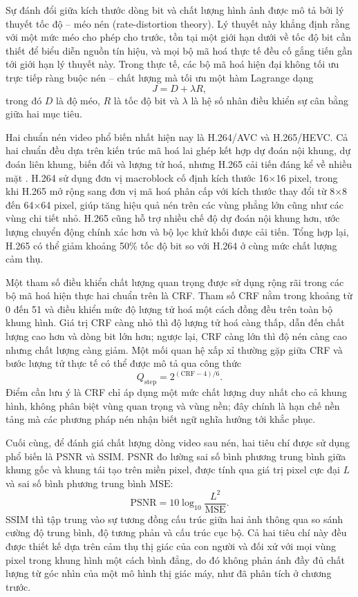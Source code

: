 Sự đánh đổi giữa kích thước dòng bit và chất lượng hình ảnh được mô tả bởi lý thuyết tốc độ -- méo nén (rate-distortion theory). Lý thuyết này khẳng định rằng với một mức méo cho phép cho trước, tồn tại một giới hạn dưới về tốc độ bit cần thiết để biểu diễn nguồn tín hiệu, và mọi bộ mã hoá thực tế đều cố gắng tiến gần tới giới hạn lý thuyết này. Trong thực tế, các bộ mã hoá hiện đại không tối ưu trực tiếp ràng buộc nén -- chất lượng mà tối ưu một hàm Lagrange dạng
\begin{equation}
  J = D + \lambda R,
\end{equation}
trong đó $D$ là độ méo, $R$ là tốc độ bit và $\lambda$ là hệ số nhân điều khiển sự cân bằng giữa hai mục tiêu.

Hai chuẩn nén video phổ biến nhất hiện nay là H.264/AVC và H.265/HEVC. Cả hai chuẩn đều dựa trên kiến trúc mã hoá lai ghép kết hợp dự đoán nội khung, dự đoán liên khung, biến đổi và lượng tử hoá, nhưng H.265 cải tiến đáng kể về nhiều mặt \cite{SAC}. H.264 sử dụng đơn vị macroblock cố định kích thước 16$\times$16 pixel, trong khi H.265 mở rộng sang đơn vị mã hoá phân cấp với kích thước thay đổi từ 8$\times$8 đến 64$\times$64 pixel, giúp tăng hiệu quả nén trên các vùng phẳng lớn cũng như các vùng chi tiết nhỏ. H.265 cũng hỗ trợ nhiều chế độ dự đoán nội khung hơn, ước lượng chuyển động chính xác hơn và bộ lọc khử khối được cải tiến. Tổng hợp lại, H.265 có thể giảm khoảng 50\% tốc độ bit so với H.264 ở cùng mức chất lượng cảm thụ.

Một tham số điều khiển chất lượng quan trọng được sử dụng rộng rãi trong các bộ mã hoá hiện thực hai chuẩn trên là CRF. Tham số CRF nằm trong khoảng từ 0 đến 51 và điều khiển mức độ lượng tử hoá một cách đồng đều trên toàn bộ khung hình. Giá trị CRF càng nhỏ thì độ lượng tử hoá càng thấp, dẫn đến chất lượng cao hơn và dòng bit lớn hơn; ngược lại, CRF càng lớn thì độ nén càng cao nhưng chất lượng càng giảm. Một mối quan hệ xấp xỉ thường gặp giữa CRF và bước lượng tử thực tế có thể được mô tả qua công thức
\begin{equation}
  Q_{\text{step}} = 2^{(\text{CRF} - 4)/6}.
\end{equation}
Điểm cần lưu ý là CRF chỉ áp dụng một mức chất lượng duy nhất cho cả khung hình, không phân biệt vùng quan trọng và vùng nền; đây chính là hạn chế nền tảng mà các phương pháp nén nhận biết ngữ nghĩa hướng tới khắc phục.

Cuối cùng, để đánh giá chất lượng dòng video sau nén, hai tiêu chí được sử dụng phổ biến là PSNR và SSIM. PSNR đo lường sai số bình phương trung bình giữa khung gốc và khung tái tạo trên miền pixel, được tính qua giá trị pixel cực đại $L$ và sai số bình phương trung bình $\text{MSE}$:
\begin{equation}
  \text{PSNR} = 10 \log_{10} \frac{L^2}{\text{MSE}}.
\end{equation}
SSIM thì tập trung vào sự tương đồng cấu trúc giữa hai ảnh thông qua so sánh cường độ trung bình, độ tương phản và cấu trúc cục bộ. Cả hai tiêu chí này đều được thiết kế dựa trên cảm thụ thị giác của con người và đối xử với mọi vùng pixel trong khung hình một cách bình đẳng, do đó không phản ánh đầy đủ chất lượng từ góc nhìn của một mô hình thị giác máy, như đã phân tích ở chương trước.

